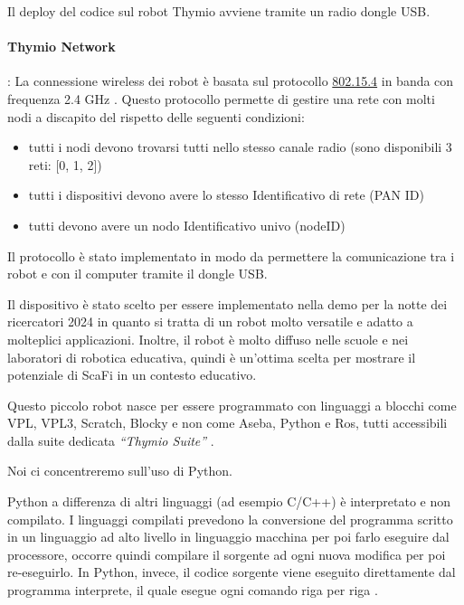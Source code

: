 \documentclass[12pt,a4paper,openright,twoside]{book}
\begin{document}
Il deploy del codice sul robot Thymio avviene tramite un radio dongle USB.
\paragraph{Thymio Network}: La connessione wireless dei robot è basata sul protocollo \href{https://en.wikipedia.org/wiki/IEEE_802.15.4}{802.15.4} in banda con frequenza 2.4 GHz \cite{wikidotSettingWireless}. Questo protocollo permette di gestire una rete con molti nodi a discapito del rispetto delle seguenti condizioni:

\begin{itemize}
    \item tutti i nodi devono trovarsi tutti nello stesso canale radio (sono disponibili 3 reti: [0, 1, 2])
    \item tutti i dispositivi devono avere lo stesso Identificativo di rete (PAN ID)
    \item tutti devono avere un nodo Identificativo univo (nodeID)
\end{itemize}

Il protocollo è stato implementato in modo da permettere la comunicazione tra i robot e con il computer tramite il dongle USB.

Il dispositivo è stato scelto per essere implementato nella demo per la notte dei ricercatori 2024 in quanto si tratta di un robot molto versatile e adatto a molteplici applicazioni. Inoltre, il robot è molto diffuso nelle scuole e nei laboratori di robotica educativa, quindi è un'ottima scelta per mostrare il potenziale di ScaFi in un contesto educativo.

Questo piccolo robot nasce per essere programmato con linguaggi a blocchi come VPL, VPL3, Scratch, Blocky e non come Aseba, Python e Ros, tutti accessibili dalla suite dedicata \textit{``Thymio Suite''} \cite{mobsyaThymioDevice}.

Noi ci concentreremo sull'uso di Python. 

Python a differenza di altri linguaggi (ad esempio C/C++) è interpretato e non compilato. I linguaggi compilati prevedono la conversione del programma scritto in un linguaggio ad alto livello in linguaggio macchina per poi farlo eseguire dal processore, occorre quindi compilare il sorgente ad ogni nuova modifica per poi re-eseguirlo. In Python, invece, il codice sorgente viene eseguito direttamente dal programma interprete, il quale esegue ogni comando riga per riga \cite{robotadvanceUsingEducational}.
\end{document}
